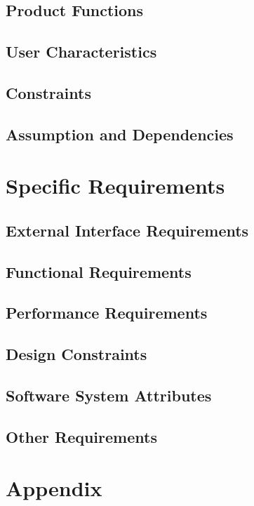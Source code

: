 \documentclass[a4paper,12pt]{article}
\begin{document}
\subsection{Product Functions}
\subsection{User Characteristics}
\subsection{Constraints}
\subsection{Assumption and Dependencies}

\section{Specific Requirements}
\subsection{External Interface Requirements}
\subsection{Functional Requirements}
\subsection{Performance Requirements}
\subsection{Design Constraints}
\subsection{Software System Attributes}
\subsection{Other Requirements}
\section{Appendix}
\newpage
\end{document}
